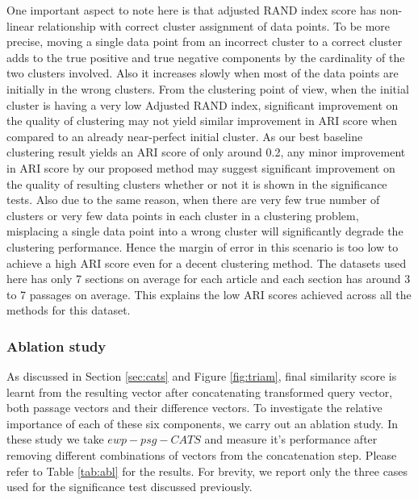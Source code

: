 One important aspect to note here is that adjusted RAND index score has non-linear relationship with correct cluster assignment of data points. To be more precise, moving a single data point from an incorrect cluster to a correct cluster adds to the true positive and true negative components by the cardinality of the two clusters involved.  Also it increases slowly when most of the data points are initially in the wrong clusters. From the clustering point of view, when the initial cluster is having a very low Adjusted RAND index, significant improvement on the quality of clustering may not yield similar improvement in ARI score when compared to an already near-perfect initial cluster. As our best baseline clustering result yields an ARI score of only around 0.2, any minor improvement in ARI score by our proposed method may suggest significant improvement on the quality of resulting clusters whether or not it is shown in the significance tests. Also due to the same reason, when there are very few true number of clusters or very few data points in each cluster in a clustering problem, misplacing a single data point into a wrong cluster will significantly degrade the clustering performance. Hence the margin of error in this scenario is too low to achieve a high ARI score even for a decent clustering method. The datasets used here has only 7 sections on average for each article and each section has around 3 to 7 passages on average. This explains the low ARI scores achieved across all the methods for this dataset.

\subsubsection{Ablation study} As discussed in Section \ref{sec:cats} and Figure \ref{fig:triam}, final similarity score is learnt from the resulting vector after concatenating transformed query vector, both passage vectors and their difference vectors. To investigate the relative importance of each of these six components, we carry out an ablation study. In these study we take $ewp-psg-CATS$ and measure it's performance after removing different combinations of vectors from the concatenation step. Please refer to Table \ref{tab:abl} for the results. For brevity, we report only the three cases used for the significance test discussed previously. 

